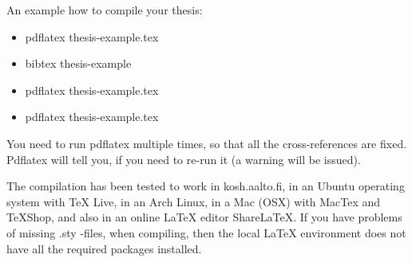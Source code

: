An example how to compile your thesis:
\begin{itemize}
	\setlength{\itemsep}{5pt}
	\item pdflatex thesis-example.tex
	\item bibtex thesis-example
	\item pdflatex thesis-example.tex
	\item pdflatex thesis-example.tex
\end{itemize}

You need to run pdflatex multiple times, so that all the cross-references
are fixed. Pdflatex will tell you, if you need to re-run it (a warning
will be issued).  

The compilation has been tested to work in kosh.aalto.fi, in an Ubuntu operating
system with TeX Live, in an Arch Linux, in a Mac (OSX) with MacTex and
TeXShop, and also in 
an online LaTeX editor ShareLaTeX. If you have problems of missing .sty -files, 
when compiling, then the local LaTeX environment does not have all the 
required packages installed.

